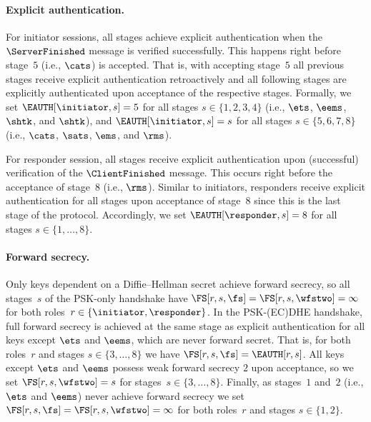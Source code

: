 \paragraph{Explicit authentication.}
For initiator sessions, all stages achieve explicit authentication when the $\ServerFinished$ message is verified successfully.
This happens right before stage~$5$ (i.e., $\cats$) is accepted.
That is, with accepting stage~$5$ all previous stages receive explicit authentication retroactively and all following stages are explicitly authenticated upon acceptance of the respective stages.
Formally, we set $\EAUTH[\initiator, s] = 5$ for all stages $s \in {\{1,2,3,4\}}$ (i.e., $\ets$, $\eems$, $\shtk$, and $\shtk$), and $\EAUTH[\initiator, s] = s$ for all stages $s \in \{5,6,7,8\}$ (i.e., $\cats$, $\sats$, $\ems$, and $\rms$).

For responder session, all stages receive explicit authentication upon (successful) verification of the $\ClientFinished$ message. 
This occurs right before the acceptance of stage~$8$ (i.e., $\rms$).
Similar to initiators, responders receive explicit authentication for all stages upon acceptance of stage~$8$ since this is the last stage of the protocol.
Accordingly, we set $\EAUTH[\responder, s] = 8$ for all stages $s \in \{1,\dotsc,8\}$.

\paragraph{Forward secrecy.}
Only keys dependent on a Diffie--Hellman secret achieve forward secrecy, so all stages~$s$ of the PSK-only handshake have $\FS[r, s, \fs] = \FS[r, s, \wfstwo] = \infty$ for both roles~$r \in \{\initiator, \responder\}$.
In the PSK-(EC)DHE handshake, full forward secrecy is achieved at the same stage as explicit authentication for all keys except $\ets$ and $\eems$, which are never forward secret.
That is, for both roles~$r$ and stages $s \in \{3,\dotsc,8\}$ we have $\FS[r, s, \fs] = \EAUTH[r, s]$.
All keys except $\ets$ and $\eems$ possess weak forward secrecy $2$ upon acceptance, so we set $\FS[r, s, \wfstwo] = s$ for stages~$s \in \{3,\dotsc,8\}$.
Finally, as stages~$1$ and~$2$ (i.e., $\ets$ and $\eems$) never achieve forward secrecy we set $\FS[r, s, \fs] = \FS[r, s, \wfstwo] = \infty$ for both roles~$r$ and stages $s \in \{1,2\}$.


